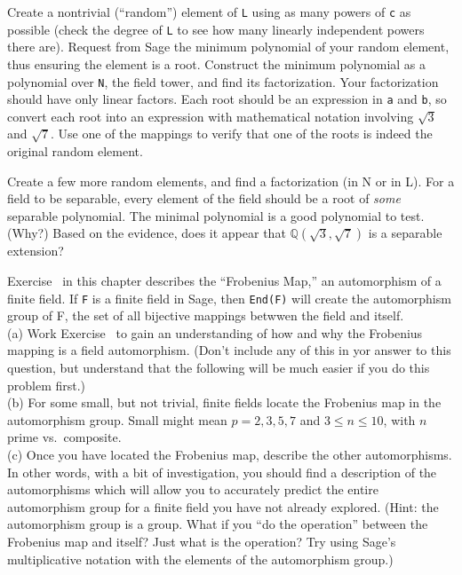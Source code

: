 %
Create a nontrivial (``random'') element of \verb?L? using as many powers of \verb?c? as possible (check the degree of \verb?L? to see how many linearly independent powers there are).  Request from Sage the minimum polynomial of your random element, thus ensuring the element is a root.  Construct the minimum polynomial as a polynomial over \verb?N?, the field tower, and find its factorization.  Your factorization should have only linear factors.  Each root should be an expression in \verb?a? and \verb?b?, so convert each root into an expression with mathematical notation involving $\sqrt{3}$ and $\sqrt{7}$.  Use one of the mappings to verify that one of the roots is indeed the original random element.\par
%
Create a few more random elements, and find a factorization (in N or in L).  For a field to be separable, every element of the field should be a root of \emph{some} separable polynomial.  The minimal polynomial is a good polynomial to test.  (Why?)  Based on the evidence, does it appear that ${\mathbb Q}(\sqrt{3},\sqrt{7})$ is a separable extension?
\begin{sageverbatim}\end{sageverbatim}
%
%
Exercise~ in this chapter describes the ``Frobenius Map,'' an automorphism of a finite field.  If \texttt{F} is a finite field in Sage, then \texttt{End(F)} will create the automorphism group of F, the set of all bijective mappings betwwen the field and itself.\\
%
(a)  Work Exercise~ to gain an understanding of how and why the Frobenius mapping is a field automorphism.  (Don't include any of this in yor answer to this question, but understand that the following will be much easier if you do this problem first.)\\
%
(b)  For some small, but not trivial, finite fields locate the Frobenius map in the automorphism group.  Small might mean $p=2,3,5,7$ and $3\leq n\leq 10$, with $n$ prime vs.\ composite.\\
%
(c)  Once you have located the Frobenius map, describe the other automorphisms.  In other words, with a bit of investigation, you should find a description of the automorphisms which will allow you to accurately predict the entire automorphism group for a finite field you have not already explored.  (Hint: the automorphism group is a group.  What if you ``do the operation'' between the Frobenius map and itself?  Just what is the operation?  Try using Sage's multiplicative notation with the elements of the automorphism group.)\\
